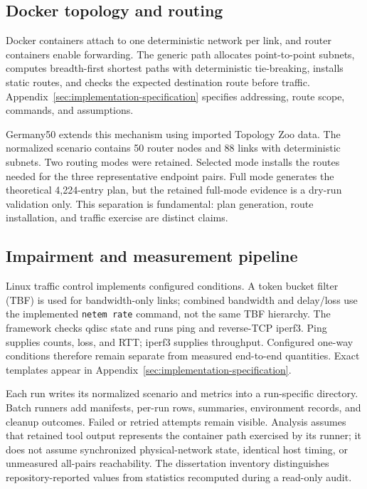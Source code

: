 \subsection{Docker topology and routing}

Docker containers attach to one deterministic network per link, and router containers enable forwarding. The generic path allocates point-to-point subnets, computes breadth-first shortest paths with deterministic tie-breaking, installs static routes, and checks the expected destination route before traffic. Appendix~\ref{sec:implementation-specification} specifies addressing, route scope, commands, and assumptions.

Germany50 extends this mechanism using imported Topology Zoo data. The normalized scenario contains 50 router nodes and 88 links with deterministic subnets. Two routing modes were retained. Selected mode installs the routes needed for the three representative endpoint pairs. Full mode generates the theoretical 4,224-entry plan, but the retained full-mode evidence is a dry-run validation only. This separation is fundamental: plan generation, route installation, and traffic exercise are distinct claims.

\subsection{Impairment and measurement pipeline}

Linux traffic control implements configured conditions. A token bucket filter (TBF) is used for bandwidth-only links; combined bandwidth and delay/loss use the implemented \texttt{netem rate} command, not the same TBF hierarchy. The framework checks qdisc state and runs ping and reverse-TCP iperf3. Ping supplies counts, loss, and RTT; iperf3 supplies throughput. Configured one-way conditions therefore remain separate from measured end-to-end quantities. Exact templates appear in Appendix~\ref{sec:implementation-specification}.

Each run writes its normalized scenario and metrics into a run-specific directory. Batch runners add manifests, per-run rows, summaries, environment records, and cleanup outcomes. Failed or retried attempts remain visible. Analysis assumes that retained tool output represents the container path exercised by its runner; it does not assume synchronized physical-network state, identical host timing, or unmeasured all-pairs reachability. The dissertation inventory distinguishes repository-reported values from statistics recomputed during a read-only audit.

